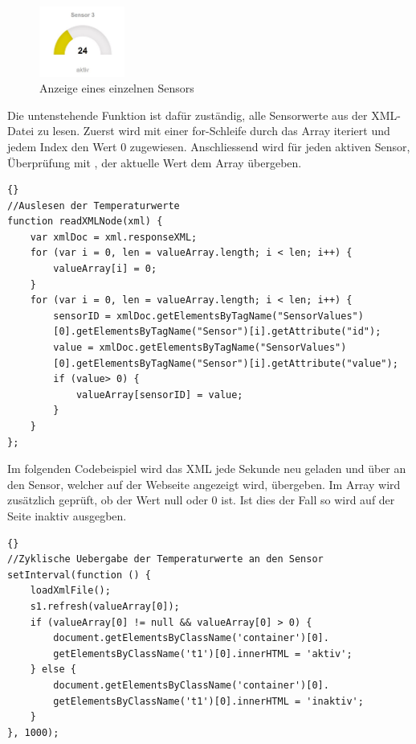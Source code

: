 \begin{figure}[H]%
\centering
\includegraphics[width=0.25\textwidth]{Images/SensorWebseite.jpg}
\caption{Anzeige eines einzelnen Sensors}
\label{fig:sensor_webpage}
\end{figure}

Die untenstehende Funktion ist dafür zuständig, alle Sensorwerte aus der XML-Datei zu lesen. Zuerst wird mit einer for-Schleife durch das Array iteriert und jedem Index den Wert 0 zugewiesen. Anschliessend wird für jeden aktiven Sensor, Überprüfung mit , der aktuelle Wert dem Array übergeben.
\begin{lstlisting}{}
//Auslesen der Temperaturwerte
function readXMLNode(xml) {
	var xmlDoc = xml.responseXML;
	for (var i = 0, len = valueArray.length; i < len; i++) {
		valueArray[i] = 0;
	}                
	for (var i = 0, len = valueArray.length; i < len; i++) {
		sensorID = xmlDoc.getElementsByTagName("SensorValues")
		[0].getElementsByTagName("Sensor")[i].getAttribute("id");
		value = xmlDoc.getElementsByTagName("SensorValues")
		[0].getElementsByTagName("Sensor")[i].getAttribute("value");
		if (value> 0) {
			valueArray[sensorID] = value;
		}
	}
};
\end{lstlisting}

Im folgenden Codebeispiel wird das XML jede Sekunde neu geladen und über  an den Sensor, welcher auf der Webseite angezeigt wird, übergeben. Im Array wird zusätzlich geprüft, ob der Wert null oder 0 ist. Ist dies der Fall so wird auf der Seite inaktiv ausgegben.

\begin{lstlisting}{}
//Zyklische Uebergabe der Temperaturwerte an den Sensor
setInterval(function () {
	loadXmlFile();
	s1.refresh(valueArray[0]);
	if (valueArray[0] != null && valueArray[0] > 0) {
		document.getElementsByClassName('container')[0].
		getElementsByClassName('t1')[0].innerHTML = 'aktiv';
	} else {
		document.getElementsByClassName('container')[0].
		getElementsByClassName('t1')[0].innerHTML = 'inaktiv';
	}
}, 1000);
\end{lstlisting}

